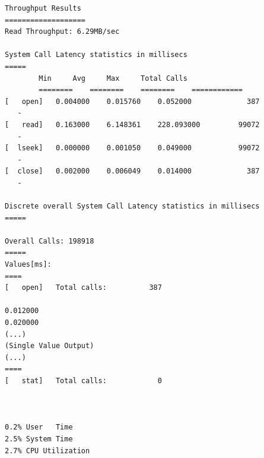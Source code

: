\begin{lstlisting}
Throughput Results
===================
Read Throughput: 6.29MB/sec

System Call Latency statistics in millisecs
=====
		Min		Avg		Max		Total Calls
		========	========	========	============
[   open]	0.004000	0.015760	0.052000	         387
   -
[   read]	0.163000	6.148361	228.093000	       99072
   -
[  lseek]	0.000000	0.001050	0.049000	       99072
   -
[  close]	0.002000	0.006049	0.014000	         387
   -

Discrete overall System Call Latency statistics in millisecs
=====

Overall Calls: 198918
=====
Values[ms]:
====
[   open]	Total calls:          387

0.012000
0.020000
(...) 
(Single Value Output)
(...)
====
[   stat]	Total calls:            0



0.2% User   Time
2.5% System Time
2.7% CPU Utilization
\end{lstlisting}

